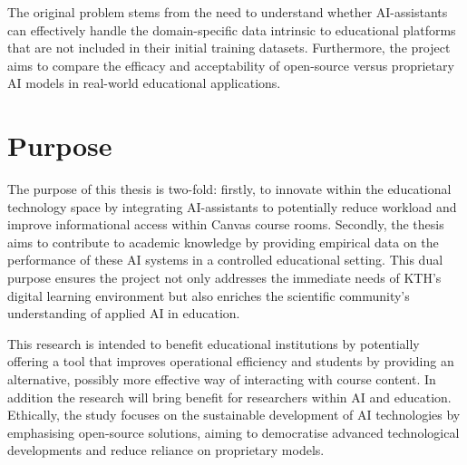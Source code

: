 The original problem stems from the need to understand whether AI-assistants can effectively handle the domain-specific data intrinsic to educational platforms that are not included in their initial training datasets. Furthermore, the project aims to compare the efficacy and acceptability of open-source versus proprietary AI models in real-world educational applications.

\section{Purpose}


The purpose of this thesis is two-fold: firstly, to innovate within the educational technology space by integrating AI-assistants to potentially reduce workload and improve informational access within Canvas course rooms. Secondly, the thesis aims to contribute to academic knowledge by providing empirical data on the performance of these AI systems in a controlled educational setting. This dual purpose ensures the project not only addresses the immediate needs of KTH's digital learning environment but also enriches the scientific community’s understanding of applied AI in education.

This research is intended to benefit educational institutions by potentially offering a tool that improves operational efficiency and students by providing an alternative, possibly more effective way of interacting with course content. In addition the research will bring benefit for researchers within AI and education. Ethically, the study focuses on the sustainable development of AI technologies by emphasising open-source solutions, aiming to democratise advanced technological developments and reduce reliance on proprietary models.


